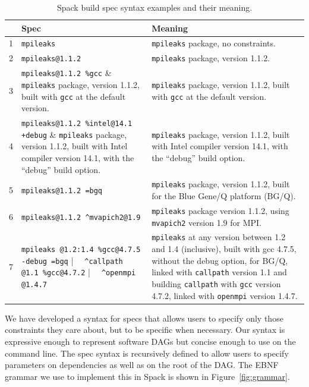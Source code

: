 \begin{table}\centering
\begin{tabular}{|r|p{2.4in}|p{4in}|}
\hline
& {\bf Spec} & {\bf Meaning} \\
\hline
\hline
1&\small\verb|mpileaks|                         & \small {\tt mpileaks} package, no constraints. \\\hline
2&\small\verb|mpileaks@1.1.2|                   & \small {\tt mpileaks} package, version 1.1.2. \\\hline
3&\small\verb|mpileaks@1.1.2 %gcc|              & \small {\tt mpileaks} package, version 1.1.2, built with {\tt gcc} at the default version. \\\hline
4&\small\verb|mpileaks@1.1.2 %intel@14.1 +debug| & \small {\tt mpileaks} package, version 1.1.2, built with Intel compiler version 14.1, \newline with the ``debug'' build option. \\\hline
5&\small\verb|mpileaks@1.1.2 =bgq|              & \small {\tt mpileaks} package, version 1.1.2, built for the Blue Gene/Q platform (BG/Q). \\\hline
6&\small\verb|mpileaks@1.1.2 ^mvapich2@1.9|     & \small {\tt mpileaks} package version 1.1.2, using {\tt mvapich2}  version 1.9 for MPI. \\\hline
7&\small\verb|mpileaks @1.2:1.4 %gcc@4.7.5 -debug =bgq| \newline
      \verb|  ^callpath @1.1 %gcc@4.7.2| \newline
      \verb|  ^openmpi @1.4.7|                & \small%
      {\tt mpileaks} at any version between 1.2 and 1.4 (inclusive), built with gcc 4.7.5, 
      without the debug option, for BG/Q, linked with {\tt callpath} version 1.1
      and building {\tt callpath} with {\tt gcc} version 4.7.2, linked with {\tt openmpi} version 1.4.7.    \\
\hline
\end{tabular}
\caption{
	Spack build spec syntax examples and their meaning.
	\label{tab:specs}
}
\end{table}


We have developed a syntax for specs that allows users to specify
only those constraints they care about, but to be specific when necessary.
Our syntax is expressive enough to represent software DAGs  but concise enough to use
on the command line. The spec syntax is recursively defined to allow users to specify
parameters on dependencies as well as on the root of the DAG.  The EBNF grammar we use
to implement this in Spack is shown in Figure~\ref{fig:grammar}.

